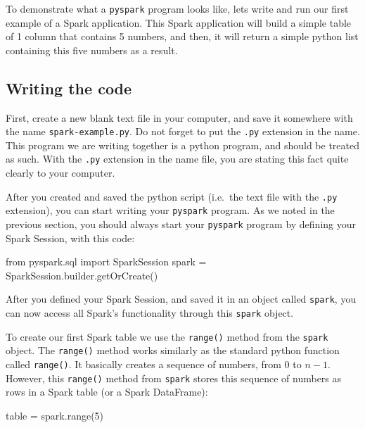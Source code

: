 \documentclass[
  11pt,
  letterpaper,
  DIV=11,
  numbers=noendperiod]{scrreprt}
\newenvironment{Shaded}{\begin{snugshade}}{\end{snugshade}}
\newcommand{\BuiltInTok}[1]{\textcolor[rgb]{0.00,0.23,0.31}{#1}}
\newcommand{\DecValTok}[1]{\textcolor[rgb]{0.68,0.00,0.00}{#1}}
\newcommand{\ImportTok}[1]{\textcolor[rgb]{0.00,0.46,0.62}{#1}}
\newcommand{\NormalTok}[1]{\textcolor[rgb]{0.00,0.23,0.31}{#1}}
\newcommand{\OperatorTok}[1]{\textcolor[rgb]{0.37,0.37,0.37}{#1}}
\begin{document}
To demonstrate what a \texttt{pyspark} program looks like, lets write
and run our first example of a Spark application. This Spark application
will build a simple table of 1 column that contains 5 numbers, and then,
it will return a simple python list containing this five numbers as a
result.

\subsection{Writing the code}\label{writing-the-code}

First, create a new blank text file in your computer, and save it
somewhere with the name \texttt{spark-example.py}. Do not forget to put
the \texttt{.py} extension in the name. This program we are writing
together is a python program, and should be treated as such. With the
\texttt{.py} extension in the name file, you are stating this fact quite
clearly to your computer.

After you created and saved the python script (i.e.~the text file with
the \texttt{.py} extension), you can start writing your \texttt{pyspark}
program. As we noted in the previous section, you should always start
your \texttt{pyspark} program by defining your Spark Session, with this
code:

\begin{Shaded}
\begin{Highlighting}[]
\ImportTok{from}\NormalTok{ pyspark.sql }\ImportTok{import}\NormalTok{ SparkSession}
\NormalTok{spark }\OperatorTok{=}\NormalTok{ SparkSession.builder.getOrCreate()}
\end{Highlighting}
\end{Shaded}

After you defined your Spark Session, and saved it in an object called
\texttt{spark}, you can now access all Spark's functionality through
this \texttt{spark} object.

To create our first Spark table we use the \texttt{range()} method from
the \texttt{spark} object. The \texttt{range()} method works similarly
as the standard python function called \texttt{range()}. It basically
creates a sequence of numbers, from 0 to \(n - 1\). However, this
\texttt{range()} method from \texttt{spark} stores this sequence of
numbers as rows in a Spark table (or a Spark DataFrame):

\begin{Shaded}
\begin{Highlighting}[]
\NormalTok{table }\OperatorTok{=}\NormalTok{ spark.}\BuiltInTok{range}\NormalTok{(}\DecValTok{5}\NormalTok{)}
\end{Highlighting}
\end{Shaded}
\end{document}
